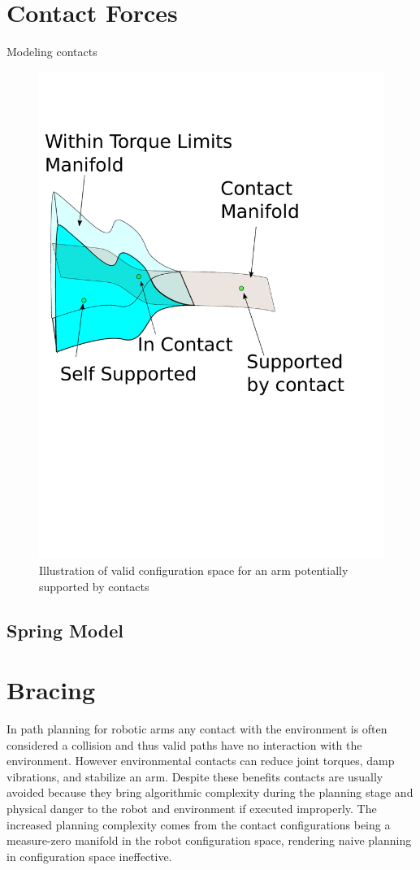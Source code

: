 \documentclass[../thesis.tex]{subfiles}
\begin{document}
\section{Contact Forces}
Modeling contacts
\begin{figure}
  \centering
  \includegraphics[width=.5\linewidth]{./Planning/thin_manifold.pdf}
  
  \caption{Illustration of valid configuration space for an arm potentially supported by contacts}
  \label{fig:ThinManifold}
\end{figure}


\subsection{Spring Model}
\subsection{}

\section{Bracing}
In path planning for robotic arms any contact with the environment is often considered a collision and thus valid paths have no interaction with the environment.
However environmental contacts can reduce joint torques, damp vibrations, and stabilize an arm.
Despite these benefits contacts are usually avoided because they bring algorithmic complexity during the planning stage and physical danger to the robot and environment if executed improperly.
The increased planning complexity comes from the contact configurations being a measure-zero manifold in the robot configuration space, rendering naive planning in configuration space ineffective. 
\end{document}

